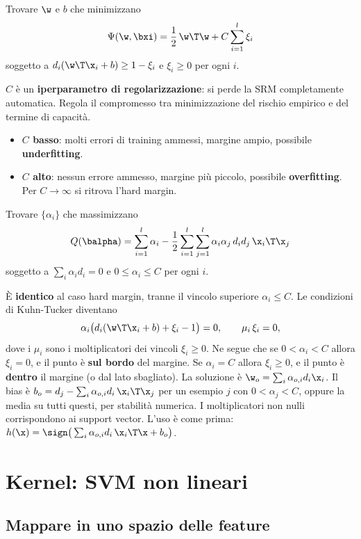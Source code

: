 \begin{definizione}
Trovare $\w$ e $b$ che minimizzano
\[
\Psi(\w,\bxi) = \frac12\,\w\T\w + C\sum_{i=1}^{l}\xi_i
\]
soggetto a $d_i(\w\T\x_i+b)\ge1-\xi_i$ e $\xi_i\ge0$ per ogni $i$.
\end{definizione}

$C$ è un \textbf{iperparametro di regolarizzazione}: si perde la SRM completamente automatica. Regola il
compromesso tra minimizzazione del rischio empirico e del termine di capacità.
\begin{itemize}
  \item \textbf{$C$ basso}: molti errori di training ammessi, margine ampio, possibile \textbf{underfitting}.
  \item \textbf{$C$ alto}: nessun errore ammesso, margine più piccolo, possibile \textbf{overfitting}. Per
        $C\to\infty$ si ritrova l'hard margin.
\end{itemize}

\begin{definizione}
Trovare $\{\alpha_i\}$ che massimizzano
\[
Q(\balpha) = \sum_{i=1}^{l}\alpha_i - \frac12\sum_{i=1}^{l}\sum_{j=1}^{l}\alpha_i\alpha_j\,d_id_j\,\x_i\T\x_j
\]
soggetto a $\sum_i\alpha_id_i=0$ e $0\le\alpha_i\le C$ per ogni $i$.
\end{definizione}

È \textbf{identico} al caso hard margin, tranne il vincolo superiore $\alpha_i\le C$. Le condizioni di Kuhn-Tucker
diventano
\[
\alpha_i\big(d_i(\w\T\x_i+b)+\xi_i-1\big) = 0,\qquad \mu_i\,\xi_i = 0,
\]
dove i $\mu_i$ sono i moltiplicatori dei vincoli $\xi_i\ge0$. Ne segue che se $0<\alpha_i<C$ allora $\xi_i=0$, e il
punto è \textbf{sul bordo} del margine. Se $\alpha_i = C$ allora $\xi_i\ge0$, e il punto è \textbf{dentro} il
margine (o dal lato sbagliato). La soluzione è $\w_o = \sum_i\alpha_{o,i}d_i\x_i$. Il bias è
$b_o = d_j - \sum_i\alpha_{o,i}d_i\,\x_i\T\x_j$ per un esempio $j$ con $0<\alpha_j<C$, oppure la media su tutti
questi, per stabilità numerica. I moltiplicatori non nulli corrispondono ai support vector. L'uso è come prima:
$h(\x) = \sign\big(\sum_i\alpha_{o,i}d_i\,\x_i\T\x + b_o\big)$.

\section{Kernel: SVM non lineari}
\label{sec:kernel}

\subsection{Mappare in uno spazio delle feature}

